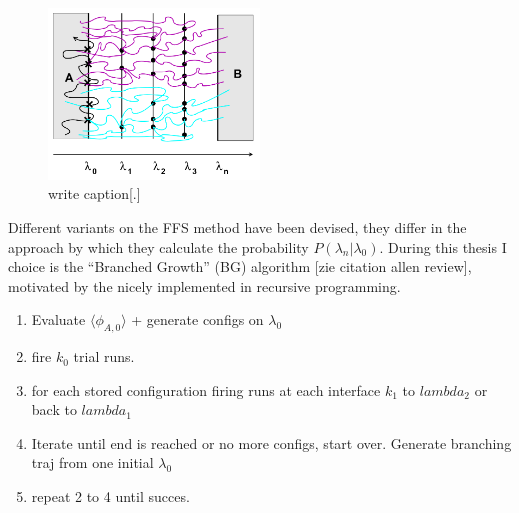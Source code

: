 \begin{figure}[ht]
\begin{center}
  \includegraphics[width=0.5\textwidth]{Figures/FFS.png}
  \caption{write caption[.]}
\end{center}
\end{figure}

Different variants on the FFS method have been devised, they differ in the approach by
which they calculate the probability $P(\lambda_n|\lambda_0)$. During this thesis I
choice is the “Branched Growth” (BG) algorithm [zie citation allen review], motivated by
the nicely implemented in recursive programming.

\begin{enumerate}
   \item Evaluate $\langle\phi_{A,0}\rangle$ + generate configs on $\lambda_0$
   \item fire $k_0$ trial runs.
   \item for each stored configuration firing runs at each interface
 $k_1$ to $lambda_2$ or back to  $
      lambda_1$
   \item Iterate until end is reached or no more configs, start over. Generate branching
      traj from one initial $\lambda_0$
   \item repeat 2 to 4 until succes.
\end{enumerate}
